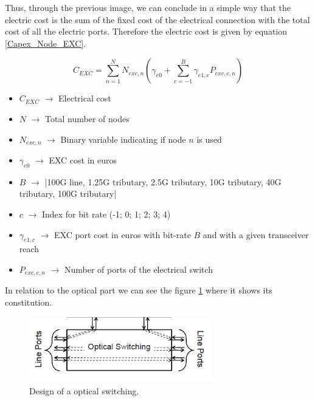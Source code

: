 Thus, through the previous image, we can conclude in a simple way that the electric cost is the sum of the fixed cost of the electrical connection with the total cost of all the electric ports.
Therefore the electric cost is given by equation \ref{Capex_Node_EXC}.

\begin{equation}
C_{EXC} = \sum_{n=1}^{N} N_{exc,n} \left( \gamma_{e0} + \sum_{c=-1}^B \gamma_{e1,c} P_{exc,c,n} \right)
\label{Capex_Node_EXC}
\end{equation}

\begin{itemize}
\item{$C_{EXC}$			$\rightarrow$	Electrical cost}
\item{$N$				$\rightarrow$	Total number of nodes}
\item{$N_{exc,n}$		$\rightarrow$	Binary variable indicating if node $n$ is used}
\item{$\gamma_{e0}$ 	$\rightarrow$	EXC cost in euros}
\item{$B$           	$\rightarrow$	|100G line, 1.25G tributary, 2.5G tributary, 10G tributary, 40G tributary, 100G tributary|}
\item{$c$               $\rightarrow$   Index for bit rate (-1; 0; 1; 2; 3; 4)}
\item{$\gamma_{e1,c}$	$\rightarrow$	EXC port cost in euros with bit-rate $B$ and with a given transceiver reach}
\item{$P_{exc,c,n}$	    $\rightarrow$	Number of ports of the electrical switch}
\end{itemize}

\vspace{11pt}
In relation to the optical part we can see the figure \ref{oxc_design} where it shows its constitution.

\begin{figure}[h!]
\centering
\includegraphics[width=8cm]{sdf/ILP/figures/oxc_design}
\caption{Design of a optical switching.}
\label{oxc_design}
\end{figure}


